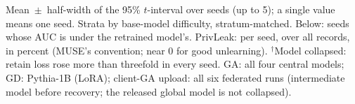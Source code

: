 \begin{table}[t]
\smallskip
{\footnotesize Mean~$\pm$~half-width of the 95\% $t$-interval over seeds (up to 5); a single value means one seed. Strata by base-model difficulty, stratum-matched. Below: seeds whose AUC is under the retrained model's. PrivLeak: per seed, over all records, in percent (MUSE's convention; near 0 for good unlearning). $^{\dagger}$Model collapsed: retain loss rose more than threefold in every seed. GA: all four central models; GD: Pythia-1B (LoRA); client-GA upload: all six federated runs (intermediate model before recovery; the released global model is not collapsed).\par}
\end{table}
